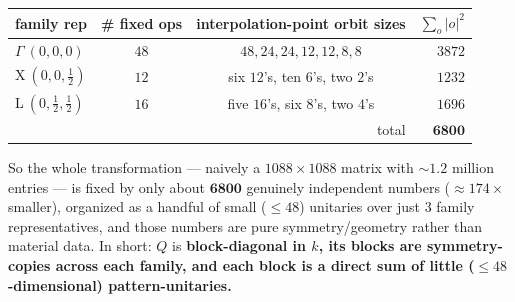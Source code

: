 \documentclass[11pt]{article}
\begin{document}
\begin{center}
\begin{tabular}{lccr}
\hline
family rep & \# fixed ops & interpolation-point orbit sizes & $\sum_o|o|^2$\\
\hline
$\Gamma\ (0,0,0)$ & $48$ & $48,24,24,12,12,8,8$ & $3872$\\
X$\ (0,0,\tfrac12)$ & $12$ & six $12$'s, ten $6$'s, two $2$'s & $1232$\\
L$\ (0,\tfrac12,\tfrac12)$ & $16$ & five $16$'s, six $8$'s, two $4$'s & $1696$\\
\hline
\multicolumn{3}{r}{total} & $\mathbf{6800}$\\
\hline
\end{tabular}
\end{center}

So the whole transformation --- naively a $1088\times1088$ matrix with $\sim\!1.2$ million entries ---
is fixed by only about $\mathbf{6800}$ genuinely independent numbers ($\approx174\times$ smaller),
organized as a handful of small ($\le48$) unitaries over just $3$ family representatives, and those
numbers are pure symmetry/geometry rather than material data. In short: $Q$ is
\textbf{block-diagonal in $k$, its blocks are symmetry-copies across each family, and each block is a
direct sum of little ($\le48$-dimensional) pattern-unitaries.}
\end{document}
